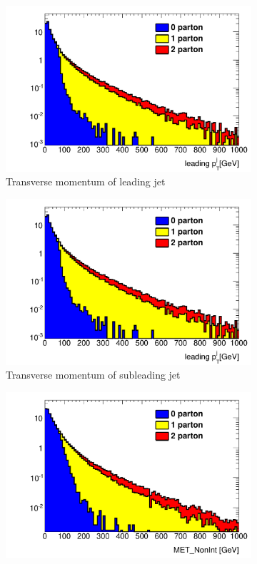 \begin{figure} [thbp]
  \center
  \begin{subfigure}{0.48\linewidth}
    \includegraphics[width=\linewidth]{figures/monojet_appendix/jet1pt_matching80.pdf}
    \caption{Transverse momentum of leading jet}
  \end{subfigure}
  \begin{subfigure}{0.48\linewidth}
    \includegraphics[width=\linewidth]{figures/monojet_appendix/jet1pt_matching80.pdf}
    \caption{Transverse momentum of subleading jet}
  \end{subfigure}
  \begin{subfigure}{0.48\linewidth}
    \includegraphics[width=\linewidth]{figures/monojet_appendix/MET_matching80.pdf}

\end{subfigure}
\end{figure}
